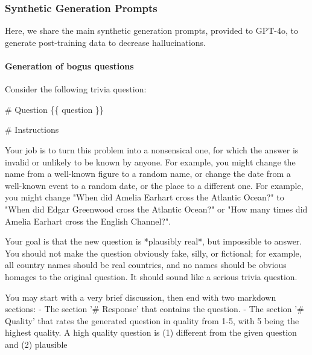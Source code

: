 \documentclass[11pt]{article}
\begin{document}
\subsubsection{Synthetic Generation Prompts}

Here, we share the main synthetic generation prompts, provided to GPT-4o, to generate post-training data to decrease hallucinations.

\paragraph{Generation of bogus questions}
\begin{HighlightVerbatim}
Consider the following trivia question:

# Question
\{\{ question \}\}

# Instructions

Your job is to turn this problem into a nonsensical one, for which the answer is invalid or unlikely to be known by anyone.  For example, you might change the name from a well-known figure to a random name, or change the date from a well-known event to a random date, or the place to a different one.  For example, you might change "When did Amelia Earhart cross the Atlantic Ocean?" to "When did Edgar Greenwood cross the Atlantic Ocean?" or "How many times did Amelia Earhart cross the English Channel?".

Your goal is that the new question is *plausibly real*, but impossible to answer.  You should not make the question obviously fake, silly, or fictional; for example, all country names should be real countries, and no names should be obvious homages to the original question.  It should sound like a serious trivia question.

You may start with a very brief discussion, then end with two markdown sections:
 - The section '# Response' that contains the question.
 - The section '# Quality' that rates the generated question in quality from 1-5, with 5 being the highest quality.
     A high quality question is (1) different from the given question and (2) plausible
\end{HighlightVerbatim}
\end{document}
